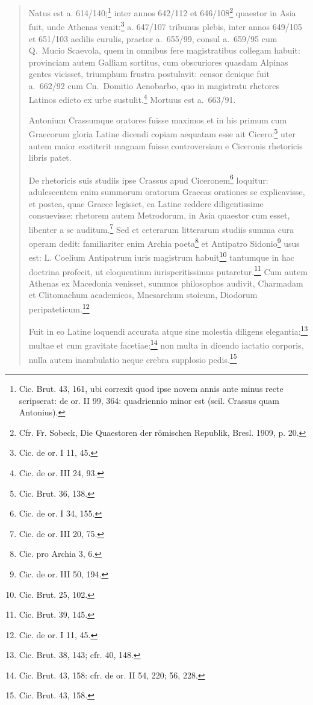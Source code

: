 \begin{quotation}

\noindent Natus est a. 614/140;\footnote{Cic. Brut. 43, 161, ubi correxit quod ipse novem annis ante minus recte scripserat: de or. II 99, 364: quadriennio minor est (scil. Crassus quam Antonius).} inter annos 642/112 et 646/108\footnote{Cfr. Fr. Sobeck, Die Quaestoren der römischen Republik, Bresl. 1909, p. 20.} quaestor in Asia fuit, unde Athenas venit:\footnote{Cic. de or. I 11, 45.} a. 647/107 tribunus plebis, inter annos 649/105 et 651/103 aedilis curulis, praetor a.~655/99, consul a.~659/95 cum Q.~Mucio Scaevola, quem in omnibus fere magistratibus collegam habuit: provinciam autem Galliam sortitus, cum obscuriores quasdam Alpinas gentes vicisset, triumphum frustra postulavit: censor denique fuit a.~662/92 cum Cn.~Domitio Aenobarbo, quo in magistratu rhetores Latinos edicto ex urbe sustulit.\footnote{Cic. de or. III 24, 93.} Mortuus est a.~663/91.

Antonium Crassumque oratores fuisse maximos et in his primum cum Graecorum gloria Latine dicendi copiam aequatam esse ait Cicero:\footnote{Cic. Brut. 36, 138.} uter autem maior exstiterit magnam fuisse controversiam e Ciceronis rhetoricis libris patet.

De rhetoricis suis studiis ipse Crassus apud Ciceronem\footnote{Cic. de or. I 34, 155.} loquitur: adulescentem enim summorum oratorum Graecas orationes se explicavisse, et postea, quae Graece legisset, ea Latine reddere diligentissime consuevisse: rhetorem autem Metrodorum, in Asia quaestor cum esset, libenter a se auditum.\footnote{Cic. de or. III 20, 75.} Sed et ceterarum litterarum studiis summa cura operam dedit: familiariter enim Archia poeta\footnote{Cic. pro Archia 3, 6.} et Antipatro Sidonio\footnote{Cic. de or. III 50, 194.} usus est: L. Coelium Antipatrum iuris magistrum habuit\footnote{Cic. Brut. 25, 102.} tantumque in hac doctrina profecit, ut eloquentium iurisperitissimus putaretur.\footnote{Cic. Brut. 39, 145.} Cum autem Athenas ex Macedonia venisset, summos philosophos audivit, Charmadam et Clitomachum academicos, Mnesarchum stoicum, Diodorum peripateticum.\footnote{Cic. de or. I 11, 45.}

Fuit in eo Latine loquendi accurata atque sine molestia diligens elegantia:\footnote{Cic. Brut. 38, 143; cfr. 40, 148.} multae et cum gravitate facetiae:\footnote{Cic. Brut. 43, 158: cfr. de or. II 54, 220; 56, 228.} non multa in dicendo iactatio corporis, nulla autem inambulatio neque crebra supplosio pedis.\footnote{Cic. Brut. 43, 158.}


\end{quotation}
